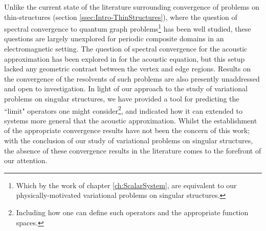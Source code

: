 Unlike the current state of the literature surrounding convergence of problems on thin-structures (section \ref{ssec:Intro-ThinStructures}), where the question of spectral  convergence to quantum graph problems\footnote{Which by the work of chapter \ref{ch:ScalarSystem}, are equivalent to our physically-motivated variational problems on singular structures.} has been well studied, these questions are largely unexplored for periodic composite domains in an electromagnetic setting.
The question of spectral convergence for the acoustic approximation has been explored in  for the acoustic equation, but this setup lacked any geometric contrast between the vertex and edge regions.
Results on the convergence of the resolvents of such problems are also presently unaddressed and open to investigation.
In light of our approach to the study of variational problems on singular structures, we have provided a tool for predicting the ``limit" operators one might consider\footnote{Including how one can define such operators and the appropriate function spaces.}, and indicated how it can extended to systems more general that the acoustic approximation.
Whilst the establishment of the appropriate convergence results have not been the concern of this work; with the conclusion of our study of variational problems on singular structures, the absence of these convergence results in the literature comes to the forefront of our attention.